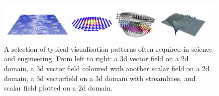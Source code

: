 %

\begin{figure}
\includegraphics[width=1.0\textwidth]{Pictures/micromagnetic-and-3d-vis-4x1.pdf}
\caption{\label{fig:3d-plots} A selection of typical visualisation patterns often required in science and engineering. From left to right: a 3d vector field on a 2d domain, a 3d vector field coloured with another scalar field on a 2d domain, a 3d vectorfield on a 3d domain with streamlines, and scalar field plotted on a 2d domain.}
\end{figure}

